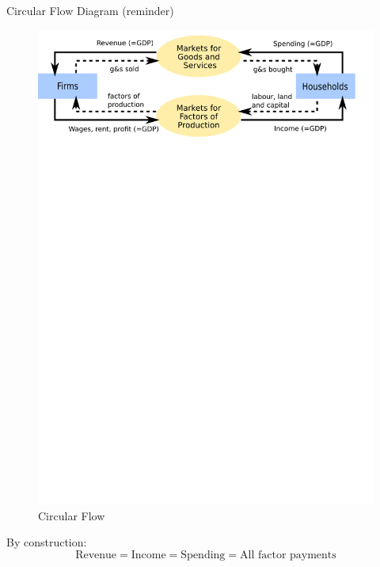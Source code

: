 \begin{frame}{Circular Flow Diagram (reminder)}
\protect\hypertarget{circular-flow-diagram-reminder}{}
\begin{figure}
\centering
\includegraphics[width=1\textwidth,height=\textheight]{assets/circle_flow.png}
\caption{Circular Flow}
\end{figure}

By construction:
\[\text{Revenue}=\text{Income}=\text{Spending}=\text{All factor payments}\]
\end{frame}

